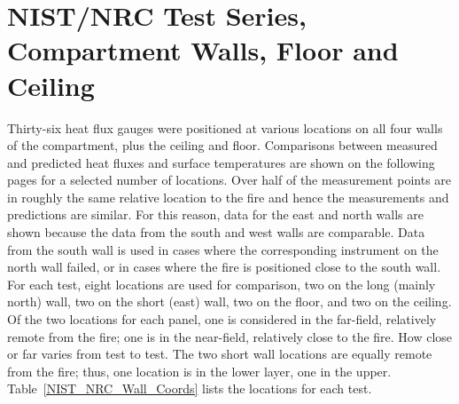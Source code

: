 \section{NIST/NRC Test Series, Compartment Walls, Floor and Ceiling}

Thirty-six heat flux gauges were positioned at various locations on all four walls of the compartment,
plus the ceiling and floor.  Comparisons between measured and predicted heat fluxes and surface temperatures are shown
on the following pages for a selected number of locations.
Over half of the measurement points are in roughly the same relative location to the fire and hence
the measurements and predictions are similar.  For this reason, data for the east and north walls are shown
because the data from the south and west walls are comparable.  Data from the south wall is used in cases where
the corresponding instrument on the north wall failed, or in cases where the fire is positioned close to the south wall.
For each test, eight locations are used for comparison, two on the long (mainly north) wall,
two on the short (east) wall, two on the floor, and two on the ceiling.  Of the two locations for each panel,
one is considered in the far-field, relatively remote from the fire; one is in the near-field,
relatively close to the fire.  How close or far varies from test to test.
The two short wall locations are equally remote from the fire; thus, one location is in the lower layer, one in the upper.
Table~\ref{NIST_NRC_Wall_Coords} lists the locations for each test.


\vspace{\baselineskip}

